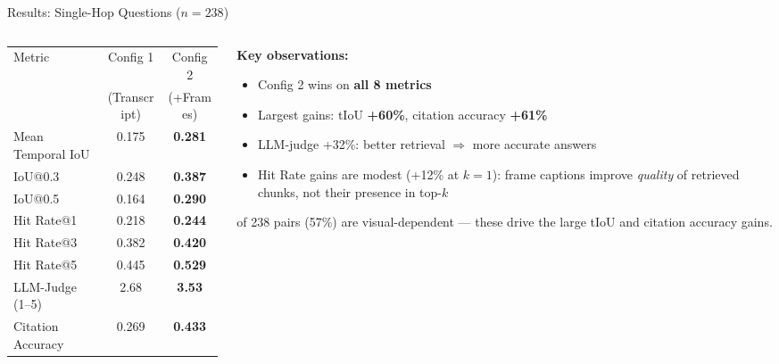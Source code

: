 \documentclass[aspectratio=169,t]{beamer}
\begin{document}
\begin{frame}{Results: Single-Hop Questions ($n = 238$)}

\begin{columns}[T]
\begin{column}{0.52\textwidth}
  \small
  \begin{tabular}{lcc}
  \toprule
  Metric & Config 1 & Config 2 \\
         & (Transcript) & (+Frames) \\
  \midrule
  Mean Temporal IoU & 0.175 & \textbf{0.281} \\
  IoU@0.3           & 0.248 & \textbf{0.387} \\
  IoU@0.5           & 0.164 & \textbf{0.290} \\
  \midrule
  Hit Rate@1        & 0.218 & \textbf{0.244} \\
  Hit Rate@3        & 0.382 & \textbf{0.420} \\
  Hit Rate@5        & 0.445 & \textbf{0.529} \\
  \midrule
  LLM-Judge (1--5)  & 2.68  & \textbf{3.53} \\
  Citation Accuracy & 0.269 & \textbf{0.433} \\
  \bottomrule
  \end{tabular}
\end{column}
\begin{column}{0.44\textwidth}
  \textbf{Key observations:}
  \begin{itemize}
    \item Config 2 wins on \textbf{all 8 metrics}
    \item Largest gains: tIoU \textbf{+60\%}, citation accuracy \textbf{+61\%}
    \item LLM-judge +32\%: better retrieval $\Rightarrow$ more accurate answers
    \item Hit Rate gains are modest (+12\% at $k{=}1$): frame captions improve
          \emph{quality} of retrieved chunks, not their presence in top-$k$
  \end{itemize}

   of 238 pairs (57\%) are visual-dependent — these drive the large tIoU
  and citation accuracy gains.
\end{column}
\end{columns}

\end{frame}
\end{document}

